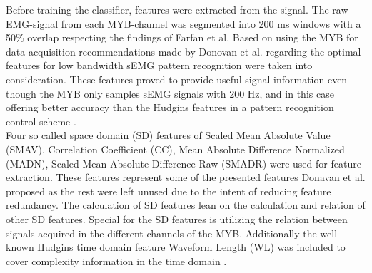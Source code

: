 	
Before training the classifier, features were extracted from the signal. The raw EMG-signal from each MYB-channel was segmented into 200 ms windows with a 50\% overlap respecting the findings of Farfan et al.\cite{Farfan2010} Based on using the MYB for data acquisition recommendations made by Donovan et al. \cite{Donovan2017} regarding the optimal features for low bandwidth sEMG pattern recognition were taken into consideration. These features proved to provide useful signal information even though the MYB only samples sEMG signals with 200 Hz, and in this case offering better accuracy than the Hudgins features \cite{Hudgins1993} in a pattern recognition control scheme \cite{Donovan2017}. \\
Four so called space domain (SD) features of Scaled Mean Absolute Value (SMAV), Correlation Coefficient (CC), Mean Absolute Difference Normalized (MADN), Scaled Mean Absolute Difference Raw (SMADR) were used for feature extraction. These features represent some of the presented features Donavan et al. proposed as the rest were left unused due to the intent of reducing feature redundancy. The calculation of SD features lean on the calculation and relation of other SD features. Special for the SD features is utilizing the relation between signals acquired in the different channels of the MYB. Additionally the well known Hudgins time domain feature Waveform Length (WL) was included to cover complexity information in the time domain \cite{Phiny2012}. %
